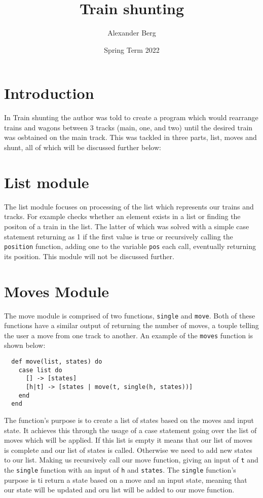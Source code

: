 \documentclass[a4paper,11pt]{article}
\begin{document}
\title{
    \textbf{Train shunting}
}
\author{Alexander Berg}
\date{Spring Term 2022}

\maketitle

\section*{Introduction}

In Train shunting the author was told to create a program which would rearrange trains and wagons between 3 tracks (main, one, and two) until the desired train was osbtained on the main track. This was tackled in three parts, list, moves and shunt, all of which will be discussed further below:

\section*{List module}

The list module focuses on processing of the list which represents our trains and tracks. For example checks whether an element exists in a list or finding the positon of a train in the list. The latter of which was solved with a simple case statement returning as 1 if the first value is true or recursively calling the {\tt position} function, adding one to the variable {\tt pos} each call, eventually returning its position. This module will not be discussed further.

\section*{Moves Module}

The move module is comprised of two functions, {\tt single} and {\tt move}. Both of these functions have a similar output of returning the number of moves, a touple telling the user a move from one track to another. An example of the {\tt moves} function is shown below:

\begin{verbatim}
  def move(list, states) do
    case list do
      [] -> [states]
      [h|t] -> [states | move(t, single(h, states))]
    end
  end
\end{verbatim}

The function's purpose is to create a list of states based on the moves and input state. It achieves this through the usage of a case statement going over the list of moves which will be applied. If this list is empty it means that our list of moves is complete and our list of states is called. Otherwise we need to add new states to our list. Making us recursively call our move function, giving an input of {\tt t} and the {\tt single} function with an input of {\tt h} and {\tt states}. The {\tt single} function's purpose is ti return a state based on a move and an input state, meaning that our state will be updated and oru list will be added to our move function. 
\end{document}
